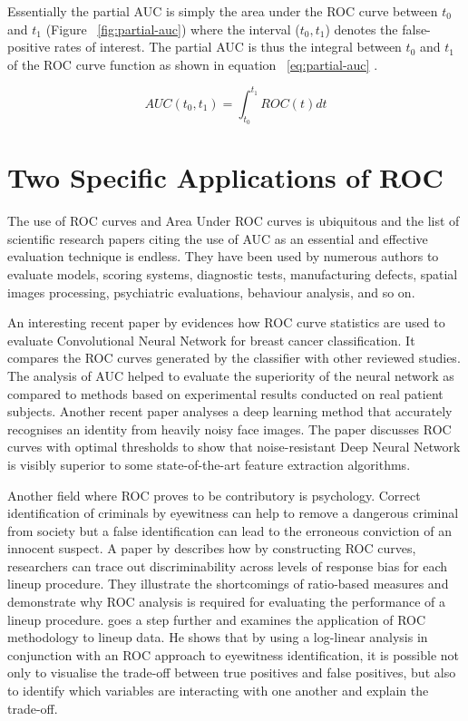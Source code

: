 Essentially the partial AUC is simply the area under the ROC curve between $t_{0}$ and $t_{1}$ (Figure ~\ref{fig:partial-auc}) where the interval ($t_{0},t_{1}$) denotes the false-positive rates of interest. The partial AUC is thus the integral between $t_{0}$ and $t_{1}$ of the ROC curve function as shown in equation ~\ref{eq:partial-auc} \citep{dodd2003pauc}.

\begin{equation}\label{eq:partial-auc}
AUC(t_{0},t_{1}) = \int_{t_{0}}^{t_{1}} ROC(t)  dt
\end{equation}

\section{Two Specific Applications of ROC}
The use of ROC curves and Area Under ROC curves is ubiquitous and the list of scientific research papers citing the use of AUC as an essential and effective evaluation technique is endless. They have been used by numerous authors to evaluate models, scoring systems, diagnostic tests, manufacturing defects, spatial images processing, psychiatric evaluations, behaviour analysis, and so on.

An interesting recent paper by \citet{fung2018cnnbcancerclass} evidences how ROC curve statistics are used to evaluate Convolutional Neural Network for breast cancer classification. It compares the ROC curves generated by the classifier with other reviewed studies. The analysis of AUC helped to evaluate the superiority of the neural network as compared to methods based on experimental results conducted on real patient subjects. Another recent paper \citep{ding1017deeplearnface} analyses a deep learning method that accurately recognises an identity from heavily noisy face images. The paper discusses ROC curves with optimal thresholds to show that noise-resistant Deep Neural Network is visibly superior to some state-of-the-art feature extraction algorithms. 

Another field where ROC proves to be contributory is psychology. Correct identification of criminals by eyewitness can help to remove a dangerous criminal from society but a false identification can lead to the erroneous conviction of an innocent suspect. A paper by \citet{gronlund2014eyewitness} describes how by constructing ROC curves, researchers can trace out discriminability across levels of response bias for each lineup procedure. They illustrate the shortcomings of ratio-based measures and demonstrate why ROC analysis is required for evaluating the performance of a lineup procedure. \citet{luby2017lineup} goes a step further and examines the application of ROC methodology to lineup data. He shows that by using a log-linear analysis in conjunction with an ROC approach to eyewitness identification, it is possible not only to visualise the trade-off between true positives and false positives, but also to identify which variables are interacting with one another and explain the trade-off.

